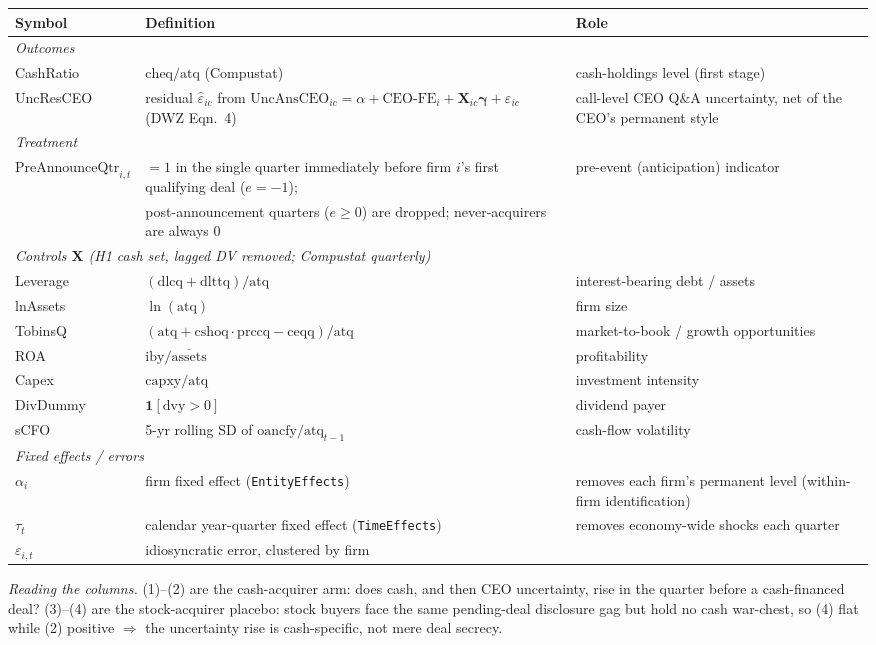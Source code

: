 \begin{center}
\small
\begin{tabular}{lll}
\toprule
Symbol & Definition & Role \\
\midrule
\multicolumn{3}{l}{\textit{Outcomes}} \\
CashRatio & $\mathrm{cheq}/\mathrm{atq}$ (Compustat) & cash-holdings level (first stage) \\
UncResCEO & residual $\widehat\varepsilon_{ic}$ from $\mathrm{UncAnsCEO}_{ic}=\alpha+\mathrm{CEO\text{-}FE}_i+\mathbf{X}_{ic}\boldsymbol\gamma+\varepsilon_{ic}$ (DWZ Eqn.\ 4) & call-level CEO Q\&A uncertainty, net of the CEO's permanent style \\
\midrule
\multicolumn{3}{l}{\textit{Treatment}} \\
$\mathrm{PreAnnounceQtr}_{i,t}$ & $=1$ in the single quarter immediately before firm $i$'s first qualifying deal ($e=-1$); & pre-event (anticipation) indicator \\
 & post-announcement quarters ($e\geq 0$) are dropped; never-acquirers are always $0$ & \\
\midrule
\multicolumn{3}{l}{\textit{Controls $\mathbf{X}$ (H1 cash set, lagged DV removed; Compustat quarterly)}} \\
Leverage & $(\mathrm{dlcq}+\mathrm{dlttq})/\mathrm{atq}$ & interest-bearing debt / assets \\
lnAssets & $\ln(\mathrm{atq})$ & firm size \\
TobinsQ  & $(\mathrm{atq}+\mathrm{cshoq}\cdot\mathrm{prccq}-\mathrm{ceqq})/\mathrm{atq}$ & market-to-book / growth opportunities \\
ROA      & $\mathrm{iby}/\overline{\mathrm{assets}}$ & profitability \\
Capex    & $\mathrm{capxy}/\mathrm{atq}$ & investment intensity \\
DivDummy & $\mathbf{1}[\mathrm{dvy}>0]$ & dividend payer \\
sCFO     & 5-yr rolling SD of $\mathrm{oancfy}/\mathrm{atq}_{t-1}$ & cash-flow volatility \\
\midrule
\multicolumn{3}{l}{\textit{Fixed effects / errors}} \\
$\alpha_i$ & firm fixed effect (\texttt{EntityEffects}) & removes each firm's permanent level (within-firm identification) \\
$\tau_t$   & calendar year-quarter fixed effect (\texttt{TimeEffects}) & removes economy-wide shocks each quarter \\
$\varepsilon_{i,t}$ & idiosyncratic error, clustered by firm & \\
\bottomrule
\end{tabular}
\end{center}

\vspace{2pt}
\noindent\small\textit{Reading the columns.} (1)--(2) are the cash-acquirer arm: does cash, and
then CEO uncertainty, rise in the quarter before a cash-financed deal? (3)--(4) are the
stock-acquirer placebo: stock buyers face the same pending-deal disclosure gag but hold
no cash war-chest, so (4) flat while (2) positive $\Rightarrow$ the uncertainty rise is
cash-specific, not mere deal secrecy.
